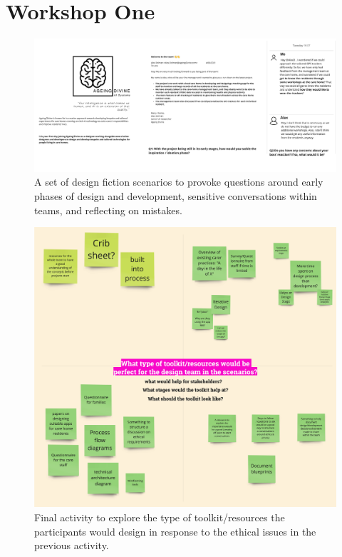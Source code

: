 \section{Workshop One}
\label{D3:W1}
\begin{figure}[htp]
    \centering
    \includegraphics[width=0.6\linewidth]{Images/Appendix/D3Toolkit/Workshop-One-Scenarios.jpg}
    \caption{A set of design fiction scenarios to provoke questions around early phases of design and development, sensitive conversations within teams, and reflecting on mistakes.}
    \label{fig:App:W1-Scenarios}
\end{figure}

\begin{figure}[htp]
    \centering
    \includegraphics[width=0.6\linewidth]{Images/Appendix/D3Toolkit/Workshop-One.jpg}
    \caption{Final activity to explore the type of toolkit/resources the participants would design in response to the ethical issues in the previous activity.}
    \label{fig:App:W1-Final}
\end{figure}

\newpage
